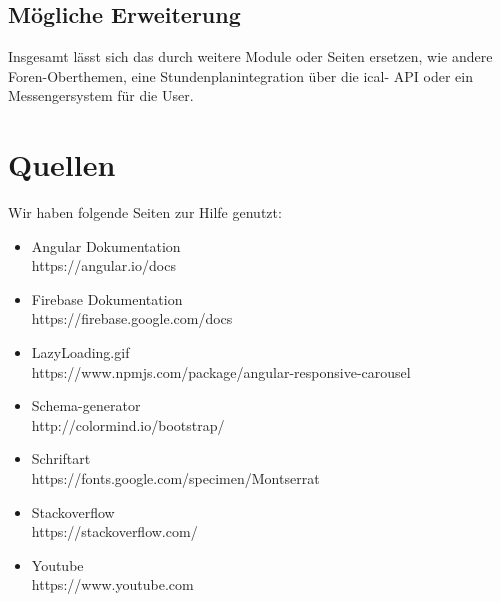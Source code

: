 \documentclass[12pt,titlepage]{article}
\begin{document}
\subsection{Mögliche Erweiterung}

Insgesamt lässt sich das durch weitere Module oder Seiten ersetzen, wie andere Foren-Oberthemen, eine Stundenplanintegration über die ical- API oder 
ein Messengersystem für die User.
\newpage
\section{Quellen}

Wir haben folgende Seiten zur Hilfe genutzt:

\begin{itemize}
\item
Angular Dokumentation \\
https://angular.io/docs

 \item 
 Firebase Dokumentation \\
https://firebase.google.com/docs

\item
LazyLoading.gif \\ 
https://www.npmjs.com/package/angular-responsive-carousel

\item
Schema-generator  \\ 
http://colormind.io/bootstrap/

\item
Schriftart \\ 
https://fonts.google.com/specimen/Montserrat

\item
Stackoverflow \\
https://stackoverflow.com/

\item
Youtube \\
https://www.youtube.com

\end{itemize}
\end{document}
